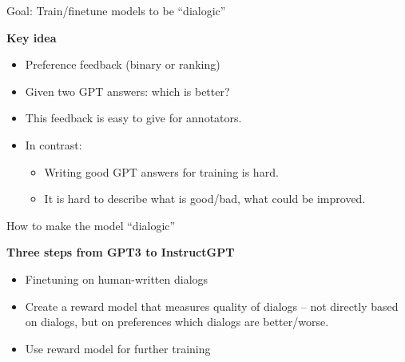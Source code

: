 \begin{vbframe}{Goal: Train/finetune models to be ``dialogic''}

\vfill

\textbf{Key idea}

	\begin{itemize}
		\item Preference feedback (binary or
                  ranking)
                  \item Given two GPT answers: which is
                    better?
                    \item This feedback is easy to give for
                      annotators.
                      \item In contrast:
	\begin{itemize}
                    \item Writing good GPT answers for
                      training is hard.
                    \item It is hard to describe what is good/bad,
                      what could be improved.
	\end{itemize}
	\end{itemize}

\vfill

\end{vbframe}


\begin{vbframe}{How to make the model ``dialogic''}

\vfill

\textbf{Three steps from GPT3 to InstructGPT}

	\begin{itemize}
		\item Finetuning on human-written dialogs
                \item Create a reward model that measures
		quality of dialogs -- not directly based on dialogs,
		but on preferences which dialogs are
		better/worse.
                \item Use reward model for further training
	\end{itemize}

\vfill

\end{vbframe}


